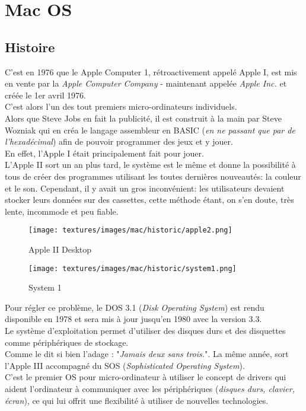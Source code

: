 \section{Mac OS}
\subsection{Histoire}
C'est en 1976 que le Apple Computer 1, rétroactivement appelé Apple I, est mis
en vente par la \textit{Apple Computer Company} - maintenant appelée
\textit{Apple Inc.} et créée le 1er avril 1976. \\
C'est alors l'un des tout premiers micro-ordinateurs individuels. \\

Alors que Steve Jobs en fait la publicité, il est construit à la main par Steve
Wozniak qui en créa le langage assembleur en BASIC (\textit{en ne passant que
par de l'hexadécimal}) afin de pouvoir programmer des jeux et y jouer. \\
En effet, l'Apple I était principalement fait pour jouer. \\

L'Apple II sort un an plus tard, le système est le même et donne la possibilité
à tous de créer des programmes utilisant les toutes dernières nouveautés: la
couleur et le son. Cependant, il y avait un gros inconvénient: les utilisateurs
devaient stocker leurs données sur des cassettes, cette méthode étant, on s'en
doute, très lente, incommode et peu fiable.

\begin{figure}[!htb] 
  \texttt{[image: textures/images/mac/historic/apple2.png]}
  \caption{Apple II Desktop}\label{fig:Apple II Desktop}
	\endminipage\hfill {}
  \texttt{[image: textures/images/mac/historic/system1.png]}
  \caption{System 1}\label{fig:System 1}
	\endminipage
\end{figure}

Pour régler ce problème, le DOS 3.1 (\textit{Disk Operating System}) est rendu
disponible en 1978 et sera mis à jour jusqu'en 1980 avec la version 3.3. \\
Le système d'exploitation permet d’utiliser des disques durs et des disquettes
comme périphériques de stockage. \\

Comme le dit si bien l'adage : "\textit{Jamais deux sans trois.}". La même
année, sort l'Apple III accompagné du SOS (\textit{Sophisticated Operating
System}). \\ C'est le premier OS pour micro-ordinateur à utiliser le
concept de drivers qui aident l’ordinateur à communiquer avec les périphériques
(\textit{disques durs, clavier, écran}), ce qui lui offrit une flexibilité à
utiliser de nouvelles technologies.

